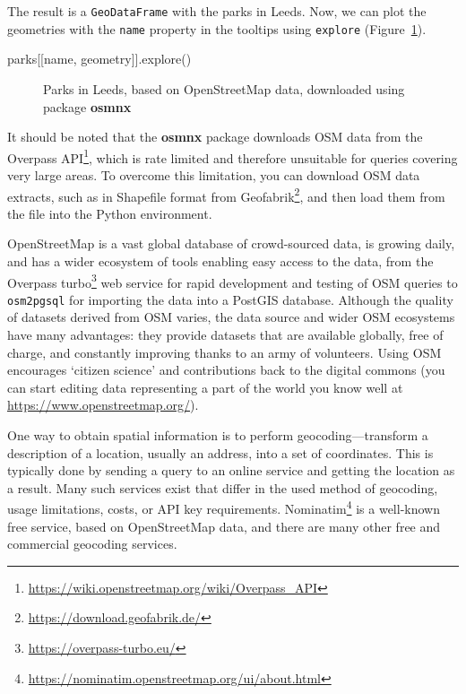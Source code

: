 \documentclass[
  letterpaper,
]{krantz}
\newenvironment{Shaded}{\begin{snugshade}}{\end{snugshade}}
\newcommand{\NormalTok}[1]{\textcolor[rgb]{0.00,0.23,0.31}{#1}}
\newcommand{\StringTok}[1]{\textcolor[rgb]{0.13,0.47,0.30}{#1}}
\begin{document}
The result is a \texttt{GeoDataFrame} with the parks in Leeds. Now, we
can plot the geometries with the \texttt{name} property in the tooltips
using \texttt{explore} (Figure~\ref{fig-ox-features}).

\begin{Shaded}
\begin{Highlighting}[]
\NormalTok{parks[[}\StringTok{\textquotesingle{}name\textquotesingle{}}\NormalTok{, }\StringTok{\textquotesingle{}geometry\textquotesingle{}}\NormalTok{]].explore()}
\end{Highlighting}
\end{Shaded}

\begin{figure}


\caption{\label{fig-ox-features}Parks in Leeds, based on OpenStreetMap
data, downloaded using package \textbf{osmnx}}

\end{figure}%

It should be noted that the \textbf{osmnx} package downloads OSM data
from the Overpass API\footnote{\url{https://wiki.openstreetmap.org/wiki/Overpass_API}},
which is rate limited and therefore unsuitable for queries covering very
large areas. To overcome this limitation, you can download OSM data
extracts, such as in Shapefile format from Geofabrik\footnote{\url{https://download.geofabrik.de/}},
and then load them from the file into the Python environment.

OpenStreetMap is a vast global database of crowd-sourced data, is
growing daily, and has a wider ecosystem of tools enabling easy access
to the data, from the Overpass turbo\footnote{\url{https://overpass-turbo.eu/}}
web service for rapid development and testing of OSM queries to
\texttt{osm2pgsql} for importing the data into a PostGIS database.
Although the quality of datasets derived from OSM varies, the data
source and wider OSM ecosystems have many advantages: they provide
datasets that are available globally, free of charge, and constantly
improving thanks to an army of volunteers. Using OSM encourages `citizen
science' and contributions back to the digital commons (you can start
editing data representing a part of the world you know well at
\url{https://www.openstreetmap.org/}).

One way to obtain spatial information is to perform
geocoding---transform a description of a location, usually an address,
into a set of coordinates. This is typically done by sending a query to
an online service and getting the location as a result. Many such
services exist that differ in the used method of geocoding, usage
limitations, costs, or API key requirements. Nominatim\footnote{\url{https://nominatim.openstreetmap.org/ui/about.html}}
is a well-known free service, based on OpenStreetMap data, and there are
many other free and commercial geocoding services.
\end{document}
